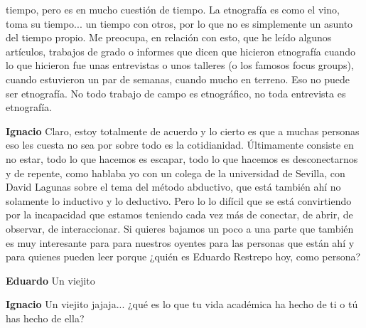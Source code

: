 \documentclass[
  spanish,
  11pt,
  a4paper,
]{scrbook}
\newenvironment{transcripcion}{
    \begin{list}{}{
        \setlength{\leftmargin}{1.5em}  %
        \setlength{\rightmargin}{0em}
        \setlength{\itemsep}{0.2em}     %
        \setlength{\parsep}{0.0em}
        \setlength{\listparindent}{0pt}
    }
}{
    \end{list}
}
\newcommand{\personaje}[1]{\textbf{#1}\quad}
\begin{document}
\begin{transcripcion}
tiempo, pero es en mucho cuestión de tiempo. La etnografía es como el vino, toma su tiempo... un tiempo con otros, por lo que no es simplemente un asunto del tiempo propio. Me preocupa, en relación con esto, que he leído algunos artículos, trabajos de grado o informes que dicen que hicieron etnografía cuando lo que hicieron fue unas entrevistas o unos talleres (o los famosos focus groups), cuando estuvieron un par de semanas, cuando mucho en terreno. Eso no puede ser etnografía. No todo trabajo de campo es etnográfico, no toda entrevista es etnografía.

\item \personaje{Ignacio} Claro, estoy totalmente de acuerdo y lo cierto es que a muchas personas eso les cuesta no sea por sobre todo es la cotidianidad. Últimamente consiste en no estar, todo lo que hacemos es escapar, todo lo que hacemos es desconectarnos y de repente, como hablaba yo con un colega de la universidad de Sevilla, con David Lagunas sobre el tema del método abductivo, que está también ahí no solamente lo inductivo y lo deductivo. Pero lo lo difícil que se está convirtiendo por la incapacidad que estamos teniendo cada vez más de conectar, de abrir, de observar, de interaccionar. Si quieres bajamos un poco a una parte que también es muy interesante para para nuestros oyentes para las personas que están ahí y para quienes pueden leer porque ¿quién es Eduardo Restrepo hoy, como persona?

\item \personaje{Eduardo} Un viejito

\item \personaje{Ignacio} Un viejito jajaja... ¿qué es lo que tu vida académica ha hecho de ti o tú has hecho de ella?


\end{transcripcion}
\end{document}
